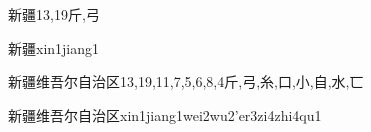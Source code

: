 \begin{Entry}{新疆}{13,19}{⽄,⼸}
  \begin{Phonetics}{新疆}{xin1jiang1}
  \end{Phonetics}
\end{Entry}

\begin{Entry}{新疆维吾尔自治区}{13,19,11,7,5,6,8,4}{⽄,⼸,⽷,⼝,⼩,⾃,⽔,⼖}
  \begin{Phonetics}{新疆维吾尔自治区}{xin1jiang1wei2wu2'er3zi4zhi4qu1}
  \end{Phonetics}
\end{Entry}


